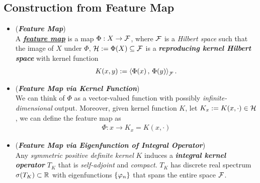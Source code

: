 \documentclass[11pt]{article}
\begin{document}
\subsection{Construction from Feature Map}
\begin{itemize}
\item \begin{definition} (\emph{\textbf{Feature Map}}) \citep{scholkopf2001learning}\\
A \underline{\emph{\textbf{feature map}}} is a map $\Phi: X\rightarrow {\mathcal F}$, where ${\mathcal F}$ is a \emph{Hilbert space} such that the image of $X$ under $\Phi$, ${\mathcal H} := \Phi(X) \subseteq {\mathcal F}$ is a \emph{\textbf{reproducing kernel Hilbert space}} with kernel function 
\begin{align*}
K(x,y) := \left\langle \Phi(x)\,,\, \Phi(y) \right\rangle_{{\mathcal F}}.
\end{align*}
\end{definition}

\item \begin{remark} (\emph{\textbf{Feature Map via Kernel Function}})\\
We can think of $\Phi$ as a vector-valued function with possibly \emph{infinite-dimensional} output. Moreover, given kernel function $K$, let $K_x:= K(x, \cdot) \in {\mathcal H}$, we can define the feature map as 
\begin{align*}
\Phi: x \rightarrow K_x = K(x, \cdot)
\end{align*}
\end{remark}

\item \begin{remark} (\emph{\textbf{Feature Map via Eigenfunction of Integral Operator}})  \citep{scholkopf2001learning, rasmussen2006gaussian}  \\
Any \emph{symmetric positive definite kernel} $K$ induces a \emph{\textbf{integral kernel operator}} $T_K$ that is \emph{self-adjoint} and \emph{compact}. $T_K$ has discrete real spectrum $\sigma(T_K) \subset {\mathbb R}$ with eigenfunctions $\left\{\varphi_n\right\}$ that spans the entire space ${\mathcal F}$. 


\end{remark}
\end{itemize}
\end{document}
